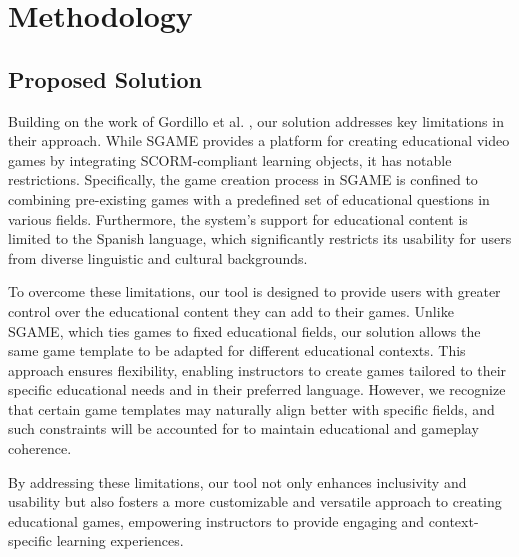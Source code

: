 \chapter{Methodology}\label{chap:method}

\section{Proposed Solution}

Building on the work of Gordillo et al. \cite{sgame2020}, our solution addresses key limitations in their approach. While SGAME provides a platform for creating educational video games by integrating SCORM-compliant learning objects, it has notable restrictions. Specifically, the game creation process in SGAME is confined to combining pre-existing games with a predefined set of educational questions in various fields. Furthermore, the system’s support for educational content is limited to the Spanish language, which significantly restricts its usability for users from diverse linguistic and cultural backgrounds.

To overcome these limitations, our tool is designed to provide users with greater control over the educational content they can add to their games. Unlike SGAME, which ties games to fixed educational fields, our solution allows the same game template to be adapted for different educational contexts. This approach ensures flexibility, enabling instructors to create games tailored to their specific educational needs and in their preferred language. However, we recognize that certain game templates may naturally align better with specific fields, and such constraints will be accounted for to maintain educational and gameplay coherence.

By addressing these limitations, our tool not only enhances inclusivity and usability but also fosters a more customizable and versatile approach to creating educational games, empowering instructors to provide engaging and context-specific learning experiences.